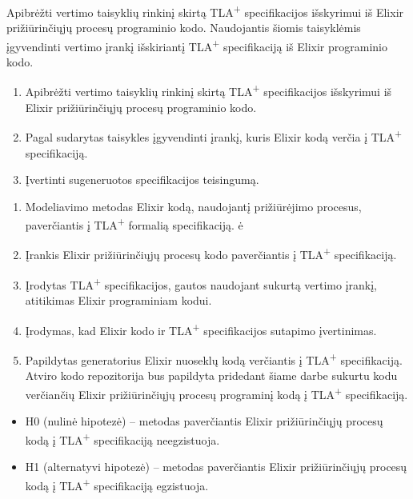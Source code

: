 \documentclass{VUMIFPSmagistrinis}
\begin{document}
        Apibrėžti vertimo taisyklių rinkinį skirtą TLA\textsuperscript{+} specifikacijos išskyrimui iš Elixir prižiūrinčiųjų procesų programinio kodo. 
        Naudojantis šiomis taisyklėmis įgyvendinti vertimo įrankį išskiriantį TLA\textsuperscript{+} specifikaciją iš Elixir programinio kodo. 
	
		\begin{enumerate}
			\item{Apibrėžti vertimo taisyklių rinkinį skirtą TLA\textsuperscript{+} specifikacijos išskyrimui iš Elixir prižiūrinčiųjų procesų programinio kodo.}
			\item{Pagal sudarytas taisykles įgyvendinti įrankį, kuris Elixir kodą verčia į TLA\textsuperscript{+} specifikaciją.}
			\item{Įvertinti sugeneruotos specifikacijos teisingumą.}
		\end{enumerate}
	
		\begin{enumerate}
                \item{Modeliavimo metodas Elixir kodą, naudojantį prižiūrėjimo procesus, paverčiantis į TLA\textsuperscript{+} formalią specifikaciją. ė}
                
			\item{Įrankis Elixir prižiūrinčiųjų procesų kodo paverčiantis į TLA\textsuperscript{+} specifikaciją.}
   
                \item{Įrodytas TLA\textsuperscript{+} specifikacijos, gautos naudojant sukurtą vertimo įrankį, atitikimas Elixir programiniam kodui.}
                
			\item{Įrodymas, kad Elixir kodo ir TLA\textsuperscript{+} specifikacijos sutapimo įvertinimas.}
   
			\item{Papildytas generatorius \cite{tlagen} Elixir nuoseklų kodą verčiantis į TLA\textsuperscript{+} specifikaciją. Atviro kodo repozitorija bus papildyta pridedant šiame darbe sukurtu kodu verčiančių Elixir prižiūrinčiųjų procesų programinį kodą į TLA\textsuperscript{+} specifikaciją.}
		\end{enumerate}

		\begin{itemize}
			\item H0 (nulinė hipotezė) -- metodas paverčiantis Elixir prižiūrinčiųjų procesų kodą į TLA\textsuperscript{+} specifikaciją neegzistuoja.
			\item H1 (alternatyvi hipotezė) -- metodas paverčiantis Elixir prižiūrinčiųjų procesų kodą į TLA\textsuperscript{+} specifikaciją egzistuoja.
		\end{itemize}
		
	\pagebreak
	\printbibliography[heading=bibintoc] 
\end{document}
